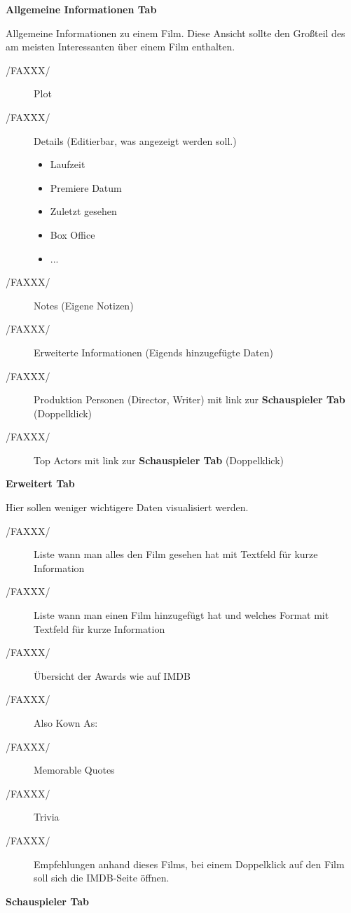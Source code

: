 \begin{description}
	\begin{description}
		\item[/FAXXX/] \textbf{Allgemeine Informationen Tab}
		\item Allgemeine Informationen zu einem Film. Diese Ansicht sollte den Großteil des am meisten Interessanten über einem Film enthalten.
		\begin{description}
			\item[/FAXXX/] Plot
			\item[/FAXXX/] Details (Editierbar, was angezeigt werden soll.)
			\begin{itemize}
				\item Laufzeit
				\item Premiere Datum
				\item Zuletzt gesehen
				\item Box Office
				\item ...
			\end{itemize}
			\item[/FAXXX/] Notes (Eigene Notizen)
			\item[/FAXXX/] Erweiterte Informationen (Eigends hinzugefügte Daten)
			\item[/FAXXX/] Produktion Personen (Director, Writer) mit link zur \textbf{Schauspieler Tab} (Doppelklick)
			\item[/FAXXX/] Top Actors mit link zur \textbf{Schauspieler Tab} (Doppelklick)	
		\end{description}			
		\item[/FAXXX/] \textbf{Erweitert Tab}
		\item Hier sollen weniger wichtigere Daten visualisiert werden.
			\begin{description}
				\item[/FAXXX/] Liste wann man alles den Film gesehen hat mit Textfeld für kurze Information
				\item[/FAXXX/] Liste wann man einen Film hinzugefügt hat und welches Format mit Textfeld für kurze Information
				\item[/FAXXX/] Übersicht der Awards wie auf IMDB
				\item[/FAXXX/] Also Kown As:
				\item[/FAXXX/] Memorable Quotes
				\item[/FAXXX/] Trivia
				\item[/FAXXX/] Empfehlungen anhand dieses Films, bei einem Doppelklick auf den Film soll sich die IMDB-Seite öffnen.
			\end{description}
		\item[/FAXXX/] \textbf{Schauspieler Tab}

\end{description}
\end{description}
